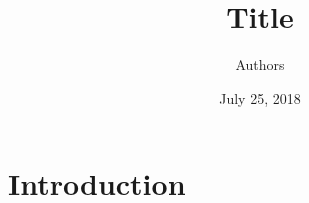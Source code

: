\documentclass[12pt]{article}
\title{Title}
\date{July 25, 2018}
\author{Authors}
\begin{document}
\maketitle

\section{Introduction}
\end{document}
